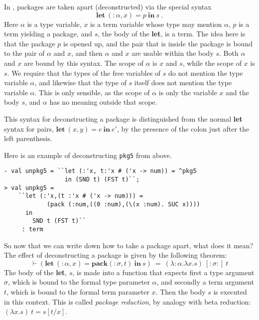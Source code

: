 In \HOLW{}, packages are taken apart (deconstructed) 
via the special syntax
$$\mathbf{let}\ ({:}\alpha,x) = p\ \mathbf{in}\ s\ .$$
Here $\alpha$ is a type variable, $x$ is a term variable whose type may mention
$\alpha$, $p$ is a term yielding a package, 
and $s$, the body of the {\bf let}, is a term.
The idea here is that the package $p$ is opened up, and
the pair that is inside the package is bound to 
the pair of $\alpha$ and $x$, 
and then $\alpha$ and $x$ are usable within the body $s$.
Both $\alpha$ and $x$ are bound by this syntax.
The scope of $\alpha$ is $x$ and $s$, while the scope of $x$ is $s$.
We require that the 
types of the free variables of $s$ do not mention the type variable $\alpha$,
and likewise that the type of $s$ itself does not mention the type variable $\alpha$.
This is only sensible, as the scope of $\alpha$ is only the variable $x$
and the body $s$, and
$\alpha$ has no meaning outside that scope.

This syntax for deconstructing a package is distinguished from the normal
{\bf let} 
syntax for 
pairs,
$\mathbf{let}\ (x,y) = e\ \mathbf{in}\ e'$,
by the presence of the colon just after the left parenthesis.

Here is an example of deconstructing \texttt{pkg5} from above.
\begin{session}
\begin{verbatim}
- val unpkg5 = ``let (:'x, t:'x # ('x -> num)) = ^pkg5
                 in (SND t) (FST t)``;
> val unpkg5 =
    ``let (:'x,(t :'x # ('x -> num))) =
            (pack (:num,((0 :num),(\(x :num). SUC x))))
      in
        SND t (FST t)``
     : term
\end{verbatim}
\end{session}

So now that we can write down how to take a package apart, what does it mean?
The effect of deconstructing a package is given by the following \HOLW{} theorem:
$$ \vdash (\mathbf{let}\ ({:}\alpha,x) = 
                         \mathbf{pack}({:}\sigma, t) %
           \ \mathbf{in}\ s)\ =\ 
          (\lambda{:}\alpha. \lambda x. s)\ [{:}\sigma{:}]\ t
$$
The body of the {\bf let}, $s$, is made into a function that expects first a
type argument $\sigma$, which is  bound to the formal type parameter $\alpha$,
and secondly a term argument $t$, which is  bound to the formal term
parameter $x$. Then the body $s$ is executed in this context.
This is called {\it package reduction}, by analogy with beta reduction:
$(\lambda x.s)\ t = s[t / x]$.

